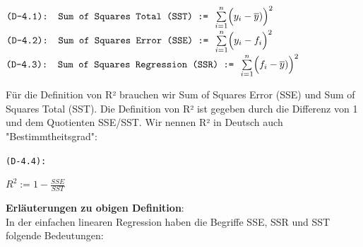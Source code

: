 \documentclass[12pt]{article}
\begin{document}
\begin{center}
$ \texttt{(D-4.1): Sum of Squares Total (SST) := } \sum\limits_{i=1}^n \Bigl(y_i - \overline{y})\Bigr)^2 $ 
$ \texttt{(D-4.2): Sum of Squares Error (SSE) := } \sum\limits_{i=1}^n \Bigl(y_i - f_i\Bigr)^2 $
$ \texttt{(D-4.3): Sum of Squares Regression (SSR) := } \sum\limits_{i=1}^n \Bigl(f_i - \overline{y})\Bigr)^2 $  
\end{center}
Für die Definition von R² brauchen wir Sum of Squares Error (SSE) und Sum of Squares Total (SST). Die Definition von R² ist gegeben durch die Differenz von 1 und dem Quotienten SSE/SST. Wir nennen R² in Deutsch auch "Bestimmtheitsgrad":\\
\begin{center}
\texttt{(D-4.4):}
\begin{Large}  
\textbf{$ R^2 := 1 - \frac{SSE}{SST} $} \\[1.0cm]
\end{Large}   
\end{center}
% 
\textbf{Erläuterungen zu obigen Definition}:\\[0.4 cm]
%
In der einfachen linearen Regression haben die Begriffe SSE, SSR und SST folgende Bedeutungen:
\end{document}
